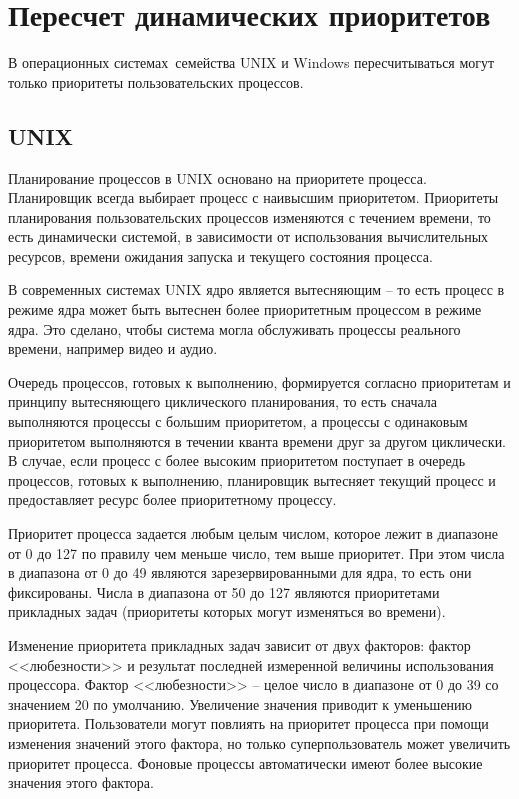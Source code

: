 
\section{Пересчет динамических приоритетов}

В операционных системах семейства UNIX и Windows пересчитываться могут только приоритеты пользовательских процессов. 

\subsection{UNIX}

Планирование процессов в UNIX основано на приоритете процесса. Планировщик всегда выбирает процесс с наивысшим приоритетом. Приоритеты планирования пользовательских процессов изменяются с течением времени, то есть динамически системой, в зависимости от использования вычислительных ресурсов, времени ожидания запуска и текущего состояния процесса. 

В современных системах UNIX ядро является вытесняющим -- то есть процесс в режиме ядра может быть вытеснен более приоритетным процессом в режиме ядра. Это сделано, чтобы система могла обслуживать процессы реального времени, например видео и аудио.

Очередь процессов, готовых к выполнению, формируется согласно приоритетам и принципу вытесняющего циклического планирования, то есть сначала выполняются процессы с большим приоритетом, а процессы с одинаковым приоритетом выполняются в течении кванта времени друг за другом циклически. В случае, если процесс с более высоким приоритетом поступает в очередь процессов, готовых к выполнению, планировщик вытесняет текущий процесс и предоставляет ресурс более приоритетному процессу.

Приоритет процесса задается любым целым числом, которое лежит в диапазоне от 0 до 127 по правилу чем меньше число, тем выше приоритет.  При этом числа в диапазона от 0 до 49 являются зарезервированными для ядра, то есть они фиксированы. Числа в диапазона от 50 до 127 являются приоритетами прикладных задач (приоритеты которых могут изменяться во времени).

Изменение приоритета прикладных задач зависит от двух факторов: фактор <<любезности>> и результат последней измеренной величины использования процессора.  Фактор <<любезности>> -- целое число в диапазоне от 0 до 39 со значением 20 по умолчанию. Увеличение значения приводит к уменьшению приоритета. Пользователи могут повлиять на приоритет процесса при помощи изменения значений этого фактора, но только суперпользователь может увеличить приоритет процесса. Фоновые процессы автоматически имеют более высокие значения этого фактора.

